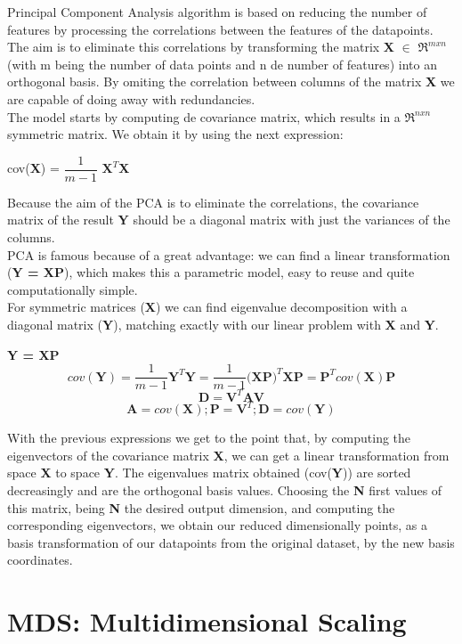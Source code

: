 \documentclass[a4paper,11pt,spanish]{report}
\begin{document}
Principal Component Analysis \citep{pca} algorithm is based on reducing the number of features by processing the correlations between the features of the datapoints. The aim is to eliminate this correlations by transforming the matrix \textbf{X} $\in$ $\Re^{mxn}$ (with m being the number of data points and n de number of features) into an orthogonal basis. By omiting the correlation between columns of the matrix \textbf{X} we are capable of doing away with redundancies.\\
The model starts by computing de covariance matrix, which results in a $\Re^{nxn}$ symmetric matrix. We obtain it by using the next expression:
\begin{center}
cov(\textbf{X}) = $\dfrac{1}{m-1}$ $\textbf{X}^{T}$\textbf{X}
\end{center}
Because the aim of the PCA is to eliminate the correlations, the covariance matrix of the result \textbf{Y} should be a diagonal matrix with just the variances of the columns.\\
PCA is famous because of a great advantage: we can find a linear transformation (\textbf{Y = XP}), which makes this a parametric model, easy to reuse and quite computationally simple.\\
For symmetric matrices (\textbf{X}) we can find eigenvalue decomposition with a diagonal matrix (\textbf{Y}), matching exactly with our linear problem with \textbf{X} and \textbf{Y}.
\begin{center}
\textbf{Y = XP}
$$ cov(\textbf{Y}) = \frac{1}{m-1} \textbf{Y}^{T} \textbf{Y} = \frac{1}{m-1} \textbf{(XP)}^{T} \textbf{XP} = \textbf{P}^{T} cov(\textbf{X})\textbf{P} $$
$$\textbf{D} = \textbf{V}^{T} \textbf{AV}$$
$$ \textbf{A} = cov(\textbf{X}); \textbf{P} = \textbf{V}^{T}; \textbf{D} = cov(\textbf{Y})$$
\end{center}

With the previous expressions we get to the point that, by computing the eigenvectors of the covariance matrix \textbf{X}, we can get a linear transformation from space \textbf{X} to space \textbf{Y}. The eigenvalues matrix obtained (cov(\textbf{Y})) are sorted decreasingly and are the orthogonal basis values. Choosing the \textbf{N} first values of this matrix, being \textbf{N} the desired output dimension, and computing the corresponding eigenvectors, we obtain our reduced dimensionally points, as a basis transformation of our datapoints from the original dataset, by the new basis coordinates.

\section{MDS: Multidimensional Scaling}
\label{sec:mds}
\end{document}
